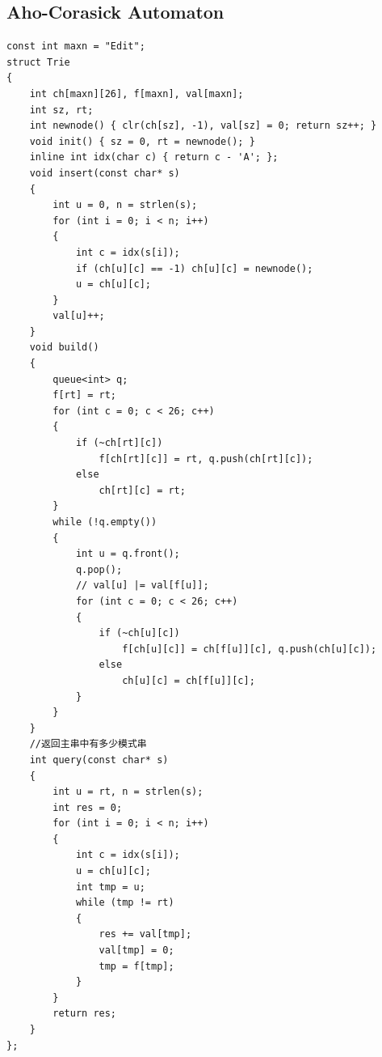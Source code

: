 \documentclass[twoside]{article}
\begin{document}
\subsection{Aho-Corasick Automaton}
\begin{lstlisting}
const int maxn = "Edit";
struct Trie
{
    int ch[maxn][26], f[maxn], val[maxn];
    int sz, rt;
    int newnode() { clr(ch[sz], -1), val[sz] = 0; return sz++; }
    void init() { sz = 0, rt = newnode(); }
    inline int idx(char c) { return c - 'A'; };
    void insert(const char* s)
    {
        int u = 0, n = strlen(s);
        for (int i = 0; i < n; i++)
        {
            int c = idx(s[i]);
            if (ch[u][c] == -1) ch[u][c] = newnode();
            u = ch[u][c];
        }
        val[u]++;
    }
    void build()
    {
        queue<int> q;
        f[rt] = rt;
        for (int c = 0; c < 26; c++)
        {
            if (~ch[rt][c])
                f[ch[rt][c]] = rt, q.push(ch[rt][c]);
            else
                ch[rt][c] = rt;
        }
        while (!q.empty())
        {
            int u = q.front();
            q.pop();
            // val[u] |= val[f[u]];
            for (int c = 0; c < 26; c++)
            {
                if (~ch[u][c])
                    f[ch[u][c]] = ch[f[u]][c], q.push(ch[u][c]);
                else
                    ch[u][c] = ch[f[u]][c];
            }
        }
    }
    //返回主串中有多少模式串
    int query(const char* s)
    {
        int u = rt, n = strlen(s);
        int res = 0;
        for (int i = 0; i < n; i++)
        {
            int c = idx(s[i]);
            u = ch[u][c];
            int tmp = u;
            while (tmp != rt)
            {
                res += val[tmp];
                val[tmp] = 0;
                tmp = f[tmp];
            }
        }
        return res;
    }
};
\end{lstlisting}
\end{document}
